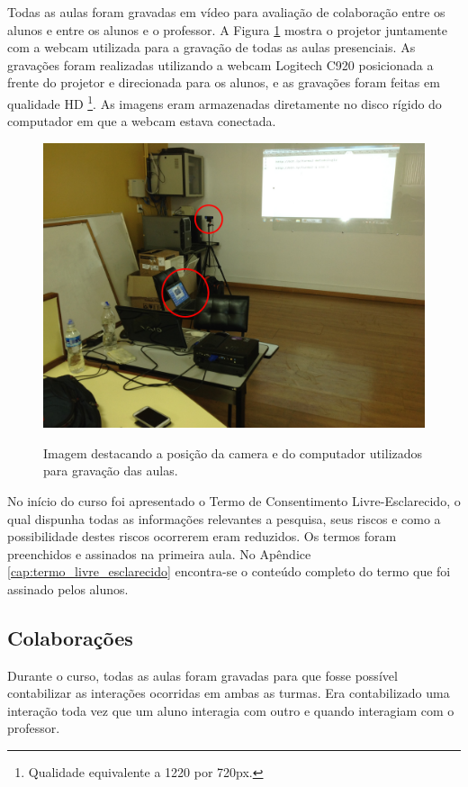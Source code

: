 Todas as aulas foram gravadas em vídeo para avaliação de colaboração entre os alunos e entre os alunos e o professor. A Figura \ref{fig:lab_2} mostra o projetor juntamente com a webcam utilizada para a gravação de todas as aulas presenciais. As gravações foram realizadas utilizando a webcam Logitech C920 posicionada a frente do projetor e direcionada para os alunos, e as gravações foram feitas em qualidade HD \footnote{Qualidade equivalente a 1220 por 720px.}. As imagens eram armazenadas diretamente no disco rígido do computador em que a webcam estava conectada.

\begin{figure}[!h]
\centering
\caption{Imagem destacando a posição da camera e do computador utilizados para gravação das aulas.}
\includegraphics[width=1.0\textwidth]{imgs/lab_2.jpg}
\label{fig:lab_2} 
\end{figure}

No início do curso foi apresentado o Termo de Consentimento Livre-Esclarecido, o qual dispunha todas as informações relevantes a pesquisa, seus riscos e como a possibilidade destes riscos ocorrerem eram reduzidos. Os termos foram preenchidos e assinados na primeira aula. No Apêndice \ref{cap:termo_livre_esclarecido} encontra-se o conteúdo completo do termo que foi assinado pelos alunos.

\subsection{Colaborações}

Durante o curso, todas as aulas foram gravadas para que fosse possível contabilizar as interações ocorridas em ambas as turmas. Era contabilizado uma interação toda vez que um aluno interagia com outro e quando interagiam com o professor.

